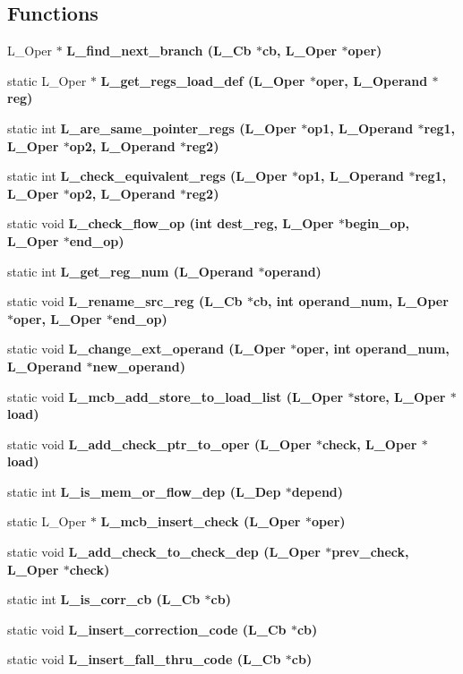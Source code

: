\subsection*{Functions}
\begin{CompactItemize}
\item 
L\_\-Oper $\ast$ \bf{L\_\-find\_\-next\_\-branch} (L\_\-Cb $\ast$cb, L\_\-Oper $\ast$oper)
\item 
static L\_\-Oper $\ast$ \bf{L\_\-get\_\-regs\_\-load\_\-def} (L\_\-Oper $\ast$oper, L\_\-Operand $\ast$reg)
\item 
static int \bf{L\_\-are\_\-same\_\-pointer\_\-regs} (L\_\-Oper $\ast$op1, L\_\-Operand $\ast$reg1, L\_\-Oper $\ast$op2, L\_\-Operand $\ast$reg2)
\item 
static int \bf{L\_\-check\_\-equivalent\_\-regs} (L\_\-Oper $\ast$op1, L\_\-Operand $\ast$reg1, L\_\-Oper $\ast$op2, L\_\-Operand $\ast$reg2)
\item 
static void \bf{L\_\-check\_\-flow\_\-op} (int dest\_\-reg, L\_\-Oper $\ast$begin\_\-op, L\_\-Oper $\ast$end\_\-op)
\item 
static int \bf{L\_\-get\_\-reg\_\-num} (L\_\-Operand $\ast$operand)
\item 
static void \bf{L\_\-rename\_\-src\_\-reg} (L\_\-Cb $\ast$cb, int operand\_\-num, L\_\-Oper $\ast$oper, L\_\-Oper $\ast$end\_\-op)
\item 
static void \bf{L\_\-change\_\-ext\_\-operand} (L\_\-Oper $\ast$oper, int operand\_\-num, L\_\-Operand $\ast$new\_\-operand)
\item 
static void \bf{L\_\-mcb\_\-add\_\-store\_\-to\_\-load\_\-list} (L\_\-Oper $\ast$store, L\_\-Oper $\ast$load)
\item 
static void \bf{L\_\-add\_\-check\_\-ptr\_\-to\_\-oper} (L\_\-Oper $\ast$check, L\_\-Oper $\ast$load)
\item 
static int \bf{L\_\-is\_\-mem\_\-or\_\-flow\_\-dep} (\bf{L\_\-Dep} $\ast$depend)
\item 
static L\_\-Oper $\ast$ \bf{L\_\-mcb\_\-insert\_\-check} (L\_\-Oper $\ast$oper)
\item 
static void \bf{L\_\-add\_\-check\_\-to\_\-check\_\-dep} (L\_\-Oper $\ast$prev\_\-check, L\_\-Oper $\ast$check)
\item 
static int \bf{L\_\-is\_\-corr\_\-cb} (L\_\-Cb $\ast$cb)
\item 
static void \bf{L\_\-insert\_\-correction\_\-code} (L\_\-Cb $\ast$cb)
\item 
static void \bf{L\_\-insert\_\-fall\_\-thru\_\-code} (L\_\-Cb $\ast$cb)

\end{CompactItemize}
